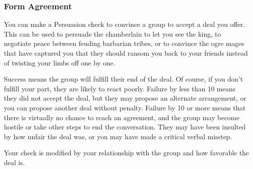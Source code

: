 \subsubsection{Form Agreement}
You can make a Persuasion check to convince a group to accept a deal you offer. This can be used to persuade the chamberlain to let you see the king, to negotiate peace between feuding barbarian tribes, or to convince the ogre mages that have captured you that they should ransom you back to your friends instead of twisting your limbs off one by one.

Success means the group will fulfill their end of the deal. Of course, if you don't fulfill your part, they are likely to react poorly. Failure by less than 10 means they did not accept the deal, but they may propose an alternate arrangement, or you can propose another deal without penalty. Failure by 10 or more means that there is virtually no chance to reach an agreement, and the group may become hostile or take other steps to end the conversation. They may have been insulted by how unfair the deal was, or you may have made a critical verbal misstep.

Your check is modified by your relationship with the group and how favorable the deal is.

